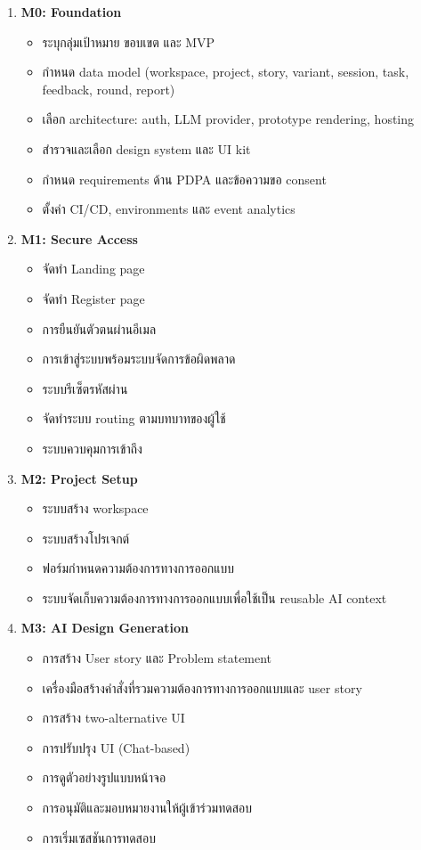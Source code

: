 \begin{enumerate}
  \item \textbf{M0: Foundation}
    \begin{itemize}
      \item ระบุกลุ่มเป้าหมาย ขอบเขต และ MVP
      \item กำหนด data model (workspace, project, story, variant, session, task, feedback, round, report)
      \item เลือก architecture: auth, LLM provider, prototype rendering, hosting
      \item สำรวจและเลือก design system และ UI kit
      \item กำหนด requirements ด้าน PDPA และข้อความขอ consent
      \item ตั้งค่า CI/CD, environments และ event analytics
    \end{itemize}

  \item \textbf{M1: Secure Access}
    \begin{itemize}
      \item จัดทำ Landing page
      \item จัดทำ Register page
      \item การยืนยันตัวตนผ่านอีเมล
      \item การเข้าสู่ระบบพร้อมระบบจัดการข้อผิดพลาด
      \item ระบบรีเซ็ตรหัสผ่าน
      \item จัดทำระบบ routing ตามบทบาทของผู้ใช้
      \item ระบบควบคุมการเข้าถึง
    \end{itemize}

  \item \textbf{M2: Project Setup}
    \begin{itemize}
      \item ระบบสร้าง workspace
      \item ระบบสร้างโปรเจกต์
      \item ฟอร์มกำหนดความต้องการทางการออกแบบ
      \item ระบบจัดเก็บความต้องการทางการออกแบบเพื่อใช้เป็น reusable AI context
    \end{itemize}

  \item \textbf{M3: AI Design Generation}
    \begin{itemize}
      \item การสร้าง User story และ Problem statement
      \item เครื่องมือสร้างคำสั่งที่รวมความต้องการทางการออกแบบและ user story
      \item การสร้าง two-alternative UI
      \item การปรับปรุง UI (Chat-based)
      \item การดูตัวอย่างรูปแบบหน้าจอ
      \item การอนุมัติและมอบหมายงานให้ผู้เข้าร่วมทดสอบ
      \item การเริ่มเซสชันการทดสอบ
    \end{itemize}


\end{enumerate}
